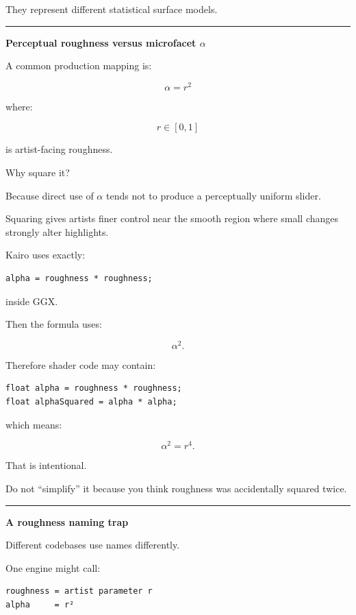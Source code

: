 They represent different statistical surface models.

\begin{center}\rule{0.5\linewidth}{0.5pt}\end{center}

\textbf{Perceptual roughness versus microfacet \(\alpha\)}

A common production mapping is:

\[
\boxed{
\alpha=r^2
}
\]

where:

\[
r\in[0,1]
\]

is artist-facing roughness.

Why square it?

Because direct use of \(\alpha\) tends not to produce a perceptually uniform slider.

Squaring gives artists finer control near the smooth region where small changes strongly alter highlights.

Kairo uses exactly:

\begin{verbatim}
alpha = roughness * roughness;
\end{verbatim}

inside GGX.

Then the formula uses:

\[
\alpha^2.
\]

Therefore shader code may contain:

\begin{verbatim}
float alpha = roughness * roughness;
float alphaSquared = alpha * alpha;
\end{verbatim}

which means:

\[
\alpha^2=r^4.
\]

That is intentional.

Do not ``simplify'' it because you think roughness was accidentally squared twice.

\begin{center}\rule{0.5\linewidth}{0.5pt}\end{center}

\textbf{A roughness naming trap}

Different codebases use names differently.

One engine might call:

\begin{verbatim}
roughness = artist parameter r
alpha     = r²
\end{verbatim}

